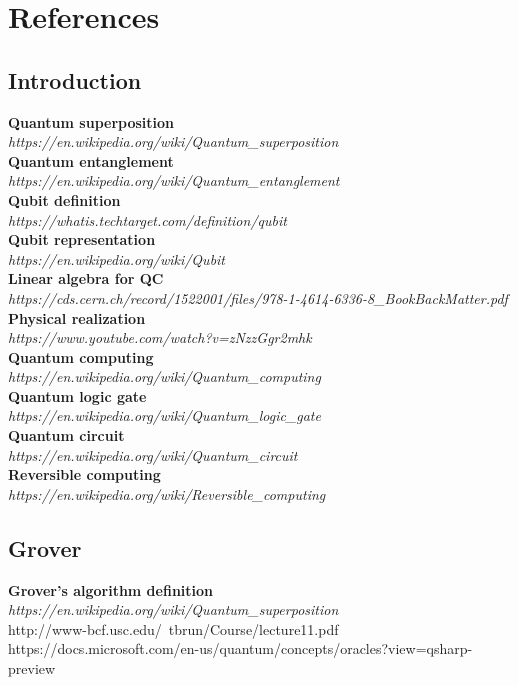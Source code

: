 \documentclass[main.tex]{subfiles}
\begin{document}
\section{References}
	\subsection{Introduction}
	\textbf{Quantum superposition}\\ \textit{https://en.wikipedia.org/wiki/Quantum\_superposition}\\
	\textbf{Quantum entanglement}\\ \textit{https://en.wikipedia.org/wiki/Quantum\_entanglement}\\
	\textbf{Qubit definition}\\ \textit{https://whatis.techtarget.com/definition/qubit}\\
	\textbf{Qubit representation}\\ \textit{https://en.wikipedia.org/wiki/Qubit}\\
	\textbf{Linear algebra for QC}\\ \textit{https://cds.cern.ch/record/1522001/files/978-1-4614-6336-8\_BookBackMatter.pdf}\\
	\textbf{Physical realization}\\ \textit{https://www.youtube.com/watch?v=zNzzGgr2mhk}\\
	\textbf{Quantum computing}\\
	\textit{https://en.wikipedia.org/wiki/Quantum\_computing}\\
	\textbf{Quantum logic gate}\\	
	\textit{https://en.wikipedia.org/wiki/Quantum\_logic\_gate}\\
	\textbf{Quantum circuit}\\
	\textit{https://en.wikipedia.org/wiki/Quantum\_circuit}\\
	\textbf{Reversible computing}\\
	\textit{https://en.wikipedia.org/wiki/Reversible\_computing}\\
	\subsection{Grover}
	\textbf{Grover's algorithm definition}\\ \textit{https://en.wikipedia.org/wiki/Quantum\_superposition}\\
	http://www-bcf.usc.edu/~tbrun/Course/lecture11.pdf\\
https://docs.microsoft.com/en-us/quantum/concepts/oracles?view=qsharp-preview
\end{document}
